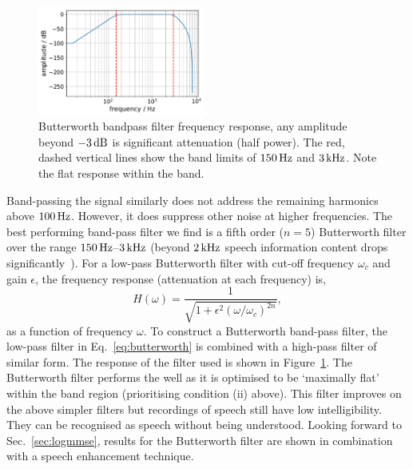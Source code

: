 \documentclass[paper-main.tex]{subfiles}
\begin{document}
\begin{figure}
	\includegraphics[width=0.49\textwidth]{figures/butterworth_150_3000.pdf}
	\caption{Butterworth bandpass filter frequency response, any amplitude beyond $-3\,{\rm dB}$ is significant attenuation (half power). The red, dashed vertical lines show the band limits of $150\,{\rm Hz}$ and $3\,{\rm kHz}$. Note the flat response within the band.}
	\label{fig:butterworth}
\end{figure}


Band-passing the signal similarly does not address the remaining harmonics above $100\,{\rm Hz}$. 
However, it does suppress other noise at higher frequencies. 
The best performing band-pass filter we find is a fifth order ($n = 5$) Butterworth filter over the range $150\,{\rm Hz}$--$3\,{\rm kHz}$ (beyond $2\,{\rm kHz}$ speech information content drops significantly~\cite{speech_intelligibility}). 
For a low-pass Butterworth filter with cut-off frequency $\omega_c$ and gain $\epsilon$, the frequency response (attenuation at each frequency) is,
\begin{equation}
\label{eq:butterworth}
H(\omega) = \frac{1}{\sqrt{1+\epsilon^2 (\omega/\omega_c)^{2n}}},
\end{equation}
as a function of frequency $\omega$. 
To construct a Butterworth band-pass filter, the low-pass filter in Eq.~\ref{eq:butterworth} is combined with a high-pass filter of similar form. 
The response of the filter used is shown in Figure~\ref{fig:butterworth}. 
The Butterworth filter performs the well as it is optimised to be `maximally flat' within the band region (prioritising condition (ii) above).
This filter improves on the above simpler filters but recordings of speech still have low intelligibility.
They can be recognised as speech without being understood.
Looking forward to Sec.~\ref{sec:logmmse}, results for the Butterworth filter are shown in combination with a speech enhancement technique. 
\end{document}
